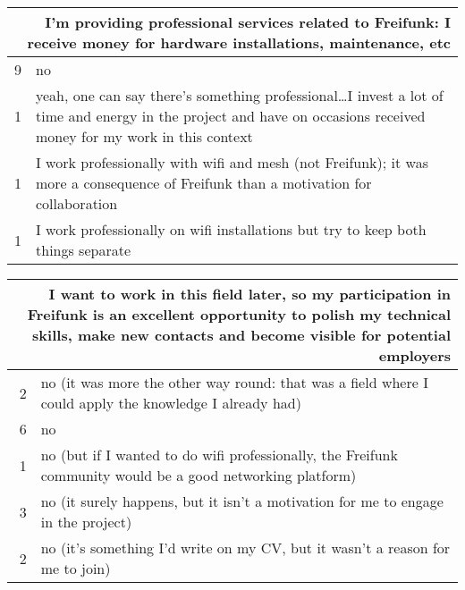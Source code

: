 \begin{table}[h]
  \begin{tabular}{| r | p{\textwidth} |}
    \hline
    \multicolumn{2}{|p{\textwidth}|}{I'm providing professional services related to Freifunk: I receive money for hardware installations, maintenance, etc} \\
    \hline
    9 & no \\
    1 & yeah, one can say there's something professional\ldots I invest a lot of time and energy in the project and have on occasions received money for my work in this context \\
    1 & I work professionally with wifi and mesh (not Freifunk); it was more a consequence of Freifunk than a motivation for collaboration \\
    1 & I work professionally on wifi installations but try to keep both things separate \\
    \hline
  \end{tabular}
\end{table}

\begin{table}[h]
  \begin{tabular}{| r | p{\textwidth} |}
    \hline
    \multicolumn{2}{|p{\textwidth}|}{I want to work in this field later, so my participation in Freifunk is an excellent opportunity to polish my technical skills, make new contacts and become visible for potential employers} \\
    \hline
    2 & no (it was more the other way round: that was a field where I could apply the knowledge I already had) \\
    6 & no \\
    1 & no (but if I wanted to do wifi professionally, the Freifunk community would be a good networking platform) \\
    3 & no (it surely happens, but it isn't a motivation for me to engage in the project) \\
    2 & no (it's something I'd write on my CV, but it wasn't a reason for me to join) \\
    \hline
  \end{tabular}
\end{table}


